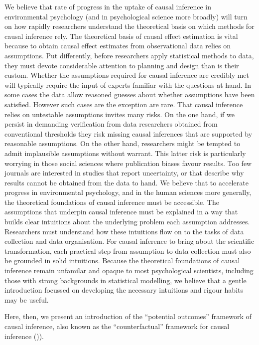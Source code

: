 \documentclass[
  singlecolumn]{article}
\begin{document}
We believe that rate of progress in the uptake of causal inference in
environmental psychology (and in psychological science more broadly)
will turn on how rapidly researchers understand the theoretical basis on
which methods for causal inference rely. The theoretical basis of causal
effect estimation is vital because to obtain causal effect estimates
from observational data relies on assumptions. Put differently, before
researchers apply statistical methods to data, they must devote
considerable attention to planning and design than is their custom.
Whether the assumptions required for causal inference are credibly met
will typically require the input of experts familiar with the questions
at hand. In some cases the data allow reasoned guesses about whether
assumptions have been satisfied. However such cases are the exception
are rare. That causal inference relies on untestable assumptions invites
many risks. On the one hand, if we persist in demanding verification
from data researchers obtained from conventional thresholds they risk
missing causal inferences that are supported by reasonable assumptions.
On the other hand, researchers might be tempted to admit implausible
assumptions without warrant. This latter risk is particularly worrying
in those social sciences where publication biases favour results. Too
few journals are interested in studies that report uncertainty, or that
describe why results cannot be obtained from the data to hand. We
believe that to accelerate progress in environmental psychology, and in
the human sciences more generally, the theoretical foundations of causal
inference must be accessible. The assumptions that underpin causal
inference must be explained in a way that builds clear intuitions about
the underlying problem each assumption addresses. Researchers must
understand how these intuitions flow on to the tasks of data collection
and data organisation. For causal inference to bring about the
scientific transformation, each practical step from assumption to data
collection must also be grounded in solid intuitions. Because the
theoretical foundations of causal inference remain unfamilar and opaque
to most psychological scientists, including those with strong
backgrounds in statistical modelling, we believe that a gentle
introduction focussed on developing the necessary intuitions and rigour
habits may be useful.

Here, then, we present an introduction of the ``potential outcomes''
framework of causal inference, also known as the ``counterfactual''
framework for causal inference ()).
\end{document}
